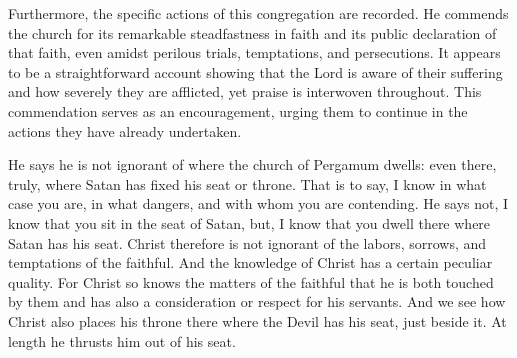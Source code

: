 Furthermore, the specific actions of this congregation are recorded. He commends the church for its remarkable steadfastness in faith and its public declaration of that faith, even amidst perilous trials, temptations, and persecutions. It appears to be a straightforward account showing that the Lord is aware of their suffering and how severely they are afflicted, yet praise is interwoven throughout. This commendation serves as an encouragement, urging them to continue in the actions they have already undertaken.

He says he is not ignorant of where the church of Pergamum dwells: even there, truly, where Satan has fixed his seat or throne. That is to say, I know in what case you are, in what dangers, and with whom you are contending. He says not, I know that you sit in the seat of Satan, but, I know that you dwell there where Satan has his seat. Christ therefore is not ignorant of the labors, sorrows, and temptations of the faithful. And the knowledge of Christ has a certain peculiar quality. For Christ so knows the matters of the faithful that he is both touched by them and has also a consideration or respect for his servants. And we see how Christ also places his throne there where the Devil has his seat, just beside it. At length he thrusts him out of his seat.

